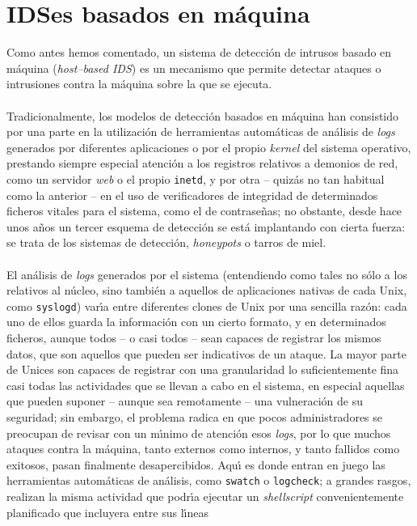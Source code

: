 \section{IDSes basados en m\'aquina}
Como antes hemos comentado, un sistema de detecci\'on de intrusos basado en
m\'aquina ({\it host--based IDS}) es un mecanismo que permite detectar ataques
o intrusiones contra la m\'aquina sobre la que se ejecuta.\\
\\Tradicionalmente, los modelos de detecci\'on basados en m\'aquina han 
consistido por una parte en la utilizaci\'on de herramientas autom\'aticas de
an\'alisis de {\it logs} generados por diferentes aplicaciones o por el propio 
{\it kernel} del sistema operativo, prestando siempre especial atenci\'on a los
registros relativos a demonios de red, como un servidor {\it web} o el propio
{\tt inetd}, y por otra -- quiz\'as no tan habitual como la anterior -- en el
uso de verificadores de integridad de determinados ficheros vitales para el
sistema, como el de contrase\~nas; no obstante, desde hace unos a\~nos un
tercer esquema de detecci\'on se est\'a implantando con cierta fuerza: se
trata de los sistemas de detecci\'on, {\it honeypots} o tarros de miel.\\
\\El an\'alisis de {\it logs} generados por el sistema (entendiendo como tales 
no s\'olo a los relativos al n\'ucleo, sino tambi\'en a aquellos de aplicaciones
nativas de cada Unix, como {\tt syslogd}) var\'{\i}a entre diferentes clones de 
Unix por una sencilla raz\'on: cada uno de ellos guarda la informaci\'on con
un cierto formato, y en determinados ficheros, aunque todos -- o casi todos --
sean capaces de registrar los mismos datos, que son aquellos que pueden ser 
indicativos de un ataque. La mayor parte de Unices son capaces de registrar con
una granularidad lo suficientemente fina casi todas las actividades que se
llevan a cabo en el sistema, en especial aquellas que pueden suponer -- aunque
sea remotamente -- una vulneraci\'on de su seguridad; sin embargo, el problema
radica en que pocos administradores se preocupan de revisar con un m\'{\i}nimo
de atenci\'on esos {\it logs}, por lo que muchos ataques contra la m\'aquina,
tanto externos como internos, y tanto fallidos como exitosos, pasan 
finalmente desapercibidos. Aqu\'{\i} es donde entran en juego las herramientas
autom\'aticas de an\'alisis, como {\tt swatch} o {\tt logcheck}; a grandes 
rasgos, realizan la misma actividad que podr\'{\i}a ejecutar un {\it 
shellscript} convenientemente planificado que incluyera entre sus l\'{\i}neas
